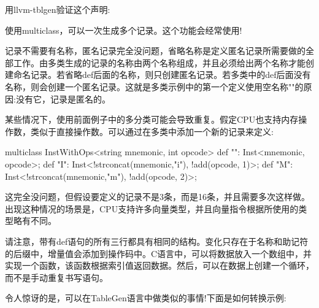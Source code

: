 用llvm-tblgen验证这个声明:


使用multiclass，可以一次生成多个记录。这个功能会经常使用!

记录不需要有名称，匿名记录完全没问题，省略名称是定义匿名记录所需要做的全部工作。由多类生成的记录的名称由两个名称组成，并且必须给出两个名称才能创建命名记录。若省略def后面的名称，则只创建匿名记录。若多类中的def后面没有名称，则会创建一个匿名记录。这就是多类示例中的第一个定义使用空名称""的原因:没有它，记录是匿名的。


某些情况下，使用前面例子中的多分类可能会导致重复。假定CPU也支持内存操作数，类似于直接操作数。可以通过在多类中添加一个新的记录来定义:

\begin{shell}
multiclass InstWithOps<string mnemonic, int opcode> {
    def "": Inst<mnemonic, opcode>;
    def "I": Inst<!strconcat(mnemonic,"i"), !add(opcode, 1)>;
    def "M": Inst<!strconcat(mnemonic,"m"), !add(opcode, 2)>;
}
\end{shell}

这完全没问题，但假设要定义的记录不是3条，而是16条，并且需要多次这样做。出现这种情况的场景是，CPU支持许多向量类型，并且向量指令根据所使用的类型略有不同。

请注意，带有def语句的所有三行都具有相同的结构。变化只存在于名称和助记符的后缀中，增量值会添加到操作码中。C语言中，可以将数据放入一个数组中，并实现一个函数，该函数根据索引值返回数据。然后，可以在数据上创建一个循环，而不是手动重复书写语句。

令人惊讶的是，可以在TableGen语言中做类似的事情!下面是如何转换示例:

